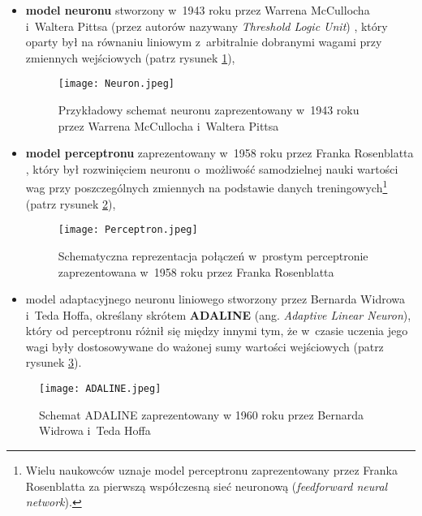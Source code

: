 \begin{itemize}
\item \textbf{model neuronu} stworzony w~1943 roku przez Warrena McCullocha i~Waltera Pittsa (przez autorów nazywany \emph{Threshold Logic Unit}) \cite{mcculloch}, który oparty był na równaniu liniowym z~arbitralnie dobranymi wagami przy zmiennych wejściowych (patrz rysunek \ref{fig:neuron1}),

\begin{figure}[!h]
    \centering \texttt{[image: Neuron.jpeg]}
    \captionsetup{format=hang}
    \caption{Przykładowy schemat neuronu zaprezentowany w~1943 roku przez Warrena McCullocha i~Waltera Pittsa \cite{mcculloch}}
    \label{fig:neuron1}
\end{figure}

\item \textbf{model perceptronu} zaprezentowany w~1958 roku przez Franka Rosenblatta \cite{rosenblatt}, który był rozwinięciem neuronu o~możliwość samodzielnej nauki wartości wag przy poszczególnych zmiennych na podstawie danych treningowych\footnote{Wielu naukowców uznaje model perceptronu zaprezentowany przez Franka Rosenblatta za pierwszą współczesną sieć neuronową (\emph{feedforward neural network}).} (patrz rysunek \ref{fig:perceptron1}),

\begin{figure}[!h]
    \centering \texttt{[image: Perceptron.jpeg]}
    \captionsetup{format=hang}
     \caption{Schematyczna reprezentacja połączeń w~prostym perceptronie zaprezentowana w~1958 roku przez Franka Rosenblatta \cite{rosenblatt}}
    \label{fig:perceptron1}
\end{figure}

\item model adaptacyjnego neuronu liniowego stworzony przez Bernarda Widrowa i~Teda Hoffa, określany skrótem \textbf{ADALINE} (ang. \emph{Adaptive Linear Neuron}), który od perceptronu różnił się między innymi tym, że w~czasie uczenia jego wagi były dostosowywane do ważonej sumy wartości wejściowych (patrz rysunek \ref{fig:adaline1}).
\end{itemize} 

\vspace{1cm}

\begin{figure}[!h]
    \centering \texttt{[image: ADALINE.jpeg]}
    \captionsetup{format=hang}
      \caption{Schemat ADALINE zaprezentowany w 1960 roku przez Bernarda Widrowa i~Teda Hoffa \cite{widrow}}
    \label{fig:adaline1}
\end{figure}

